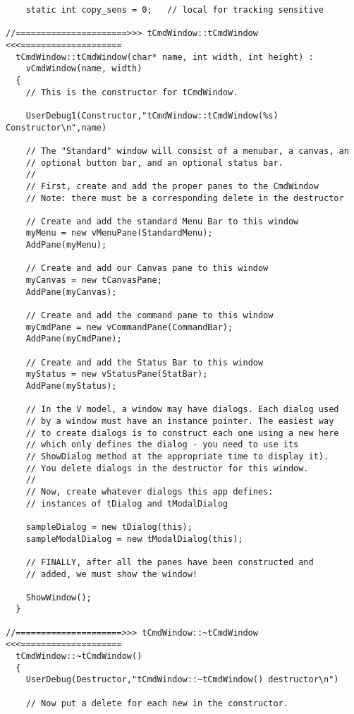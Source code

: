 \begin{verbatim}
    static int copy_sens = 0;   // local for tracking sensitive

//======================>>> tCmdWindow::tCmdWindow <<<====================
  tCmdWindow::tCmdWindow(char* name, int width, int height) :
    vCmdWindow(name, width)
  {
    // This is the constructor for tCmdWindow. 
    
    UserDebug1(Constructor,"tCmdWindow::tCmdWindow(%s) Constructor\n",name)

    // The "Standard" window will consist of a menubar, a canvas, an
    // optional button bar, and an optional status bar.
    // 
    // First, create and add the proper panes to the CmdWindow
    // Note: there must be a corresponding delete in the destructor

    // Create and add the standard Menu Bar to this window
    myMenu = new vMenuPane(StandardMenu);
    AddPane(myMenu);

    // Create and add our Canvas pane to this window
    myCanvas = new tCanvasPane;
    AddPane(myCanvas);

    // Create and add the command pane to this window
    myCmdPane = new vCommandPane(CommandBar);
    AddPane(myCmdPane);

    // Create and add the Status Bar to this window
    myStatus = new vStatusPane(StatBar);
    AddPane(myStatus);

    // In the V model, a window may have dialogs. Each dialog used
    // by a window must have an instance pointer. The easiest way
    // to create dialogs is to construct each one using a new here
    // which only defines the dialog - you need to use its
    // ShowDialog method at the appropriate time to display it).
    // You delete dialogs in the destructor for this window.
    // 
    // Now, create whatever dialogs this app defines:
    // instances of tDialog and tModalDialog

    sampleDialog = new tDialog(this);
    sampleModalDialog = new tModalDialog(this);

    // FINALLY, after all the panes have been constructed and
    // added, we must show the window!

    ShowWindow();
  }

//=====================>>> tCmdWindow::~tCmdWindow <<<====================
  tCmdWindow::~tCmdWindow()
  {
    UserDebug(Destructor,"tCmdWindow::~tCmdWindow() destructor\n")

    // Now put a delete for each new in the constructor.


\end{verbatim}
